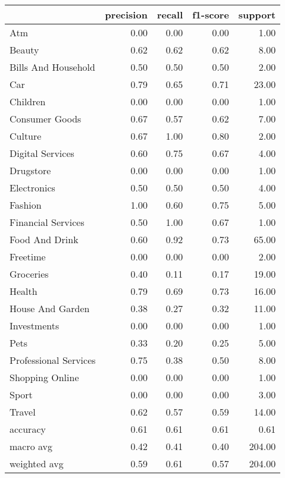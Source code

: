 \begin{tabular}{lrrrr}
\toprule
{} &  precision &  recall &  f1-score &  support \\
\midrule
Atm                   &       0.00 &    0.00 &      0.00 &     1.00 \\
Beauty                &       0.62 &    0.62 &      0.62 &     8.00 \\
Bills And Household   &       0.50 &    0.50 &      0.50 &     2.00 \\
Car                   &       0.79 &    0.65 &      0.71 &    23.00 \\
Children              &       0.00 &    0.00 &      0.00 &     1.00 \\
Consumer Goods        &       0.67 &    0.57 &      0.62 &     7.00 \\
Culture               &       0.67 &    1.00 &      0.80 &     2.00 \\
Digital Services      &       0.60 &    0.75 &      0.67 &     4.00 \\
Drugstore             &       0.00 &    0.00 &      0.00 &     1.00 \\
Electronics           &       0.50 &    0.50 &      0.50 &     4.00 \\
Fashion               &       1.00 &    0.60 &      0.75 &     5.00 \\
Financial Services    &       0.50 &    1.00 &      0.67 &     1.00 \\
Food And Drink        &       0.60 &    0.92 &      0.73 &    65.00 \\
Freetime              &       0.00 &    0.00 &      0.00 &     2.00 \\
Groceries             &       0.40 &    0.11 &      0.17 &    19.00 \\
Health                &       0.79 &    0.69 &      0.73 &    16.00 \\
House And Garden      &       0.38 &    0.27 &      0.32 &    11.00 \\
Investments           &       0.00 &    0.00 &      0.00 &     1.00 \\
Pets                  &       0.33 &    0.20 &      0.25 &     5.00 \\
Professional Services &       0.75 &    0.38 &      0.50 &     8.00 \\
Shopping Online       &       0.00 &    0.00 &      0.00 &     1.00 \\
Sport                 &       0.00 &    0.00 &      0.00 &     3.00 \\
Travel                &       0.62 &    0.57 &      0.59 &    14.00 \\
accuracy              &       0.61 &    0.61 &      0.61 &     0.61 \\
macro avg             &       0.42 &    0.41 &      0.40 &   204.00 \\
weighted avg          &       0.59 &    0.61 &      0.57 &   204.00 \\
\bottomrule
\end{tabular}
